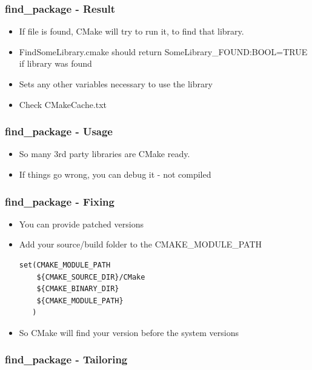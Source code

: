 \subsubsection{find\_package - Result}\label{findux5fpackage---result}

\begin{itemize}
\itemsep1pt\parskip0pt
\item
  If file is found, CMake will try to run it, to find that library.
\item
  FindSomeLibrary.cmake should return SomeLibrary\_FOUND:BOOL=TRUE if
  library was found
\item
  Sets any other variables necessary to use the library
\item
  Check CMakeCache.txt
\end{itemize}

\subsubsection{find\_package - Usage}\label{findux5fpackage---usage}

\begin{itemize}
\itemsep1pt\parskip0pt
\item
  So many 3rd party libraries are CMake ready.
\item
  If things go wrong, you can debug it - not compiled
\end{itemize}

\subsubsection{find\_package - Fixing}\label{findux5fpackage---fixing}

\begin{itemize}
\item
  You can provide patched versions
\item
  Add your source/build folder to the CMAKE\_MODULE\_PATH

\begin{verbatim}
set(CMAKE_MODULE_PATH
    ${CMAKE_SOURCE_DIR}/CMake
    ${CMAKE_BINARY_DIR}
    ${CMAKE_MODULE_PATH}
   )
\end{verbatim}
\item
  So CMake will find your version before the system versions
\end{itemize}

\subsubsection{find\_package -
Tailoring}\label{findux5fpackage---tailoring}


